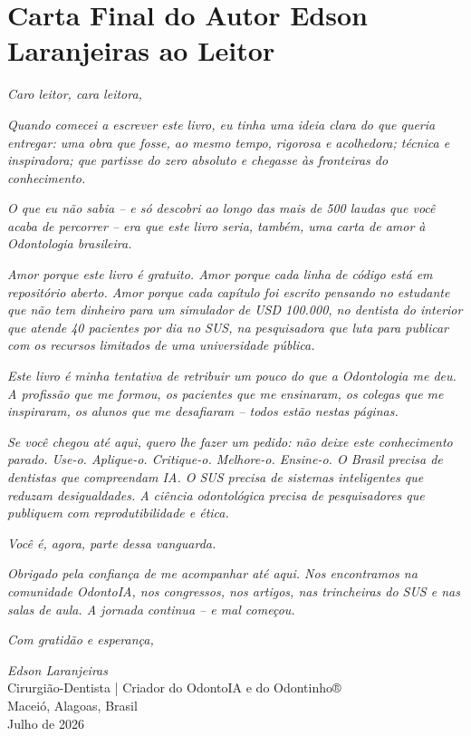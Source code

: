 \section{Carta Final do Autor Edson Laranjeiras ao Leitor}
\label{sec:carta-autor}

\nivelzero

\textit{Caro leitor, cara leitora,}

\textit{Quando comecei a escrever este livro, eu tinha uma ideia clara do que
queria entregar: uma obra que fosse, ao mesmo tempo, rigorosa e acolhedora;
técnica e inspiradora; que partisse do zero absoluto e chegasse às fronteiras
do conhecimento.}

\textit{O que eu não sabia -- e só descobri ao longo das mais de 500 laudas que
você acaba de percorrer -- era que este livro seria, também, uma carta de amor
à Odontologia brasileira.}

\textit{Amor porque este livro é gratuito. Amor porque cada linha de código está
em repositório aberto. Amor porque cada capítulo foi escrito pensando no
estudante que não tem dinheiro para um simulador de USD 100.000, no dentista
do interior que atende 40 pacientes por dia no SUS, na pesquisadora que luta
para publicar com os recursos limitados de uma universidade pública.}

\textit{Este livro é minha tentativa de retribuir um pouco do que a Odontologia
me deu. A profissão que me formou, os pacientes que me ensinaram, os colegas
que me inspiraram, os alunos que me desafiaram -- todos estão nestas páginas.}

\textit{Se você chegou até aqui, quero lhe fazer um pedido: não deixe este
conhecimento parado. Use-o. Aplique-o. Critique-o. Melhore-o. Ensine-o.
O Brasil precisa de dentistas que compreendam IA. O SUS precisa de sistemas
inteligentes que reduzam desigualdades. A ciência odontológica precisa de
pesquisadores que publiquem com reprodutibilidade e ética.}

\textit{Você é, agora, parte dessa vanguarda.}

\textit{Obrigado pela confiança de me acompanhar até aqui. Nos encontramos na
comunidade OdontoIA, nos congressos, nos artigos, nas trincheiras do SUS e nas
salas de aula. A jornada continua -- e mal começou.}

\begin{flushright}
\textit{Com gratidão e esperança,}

\textit{Edson Laranjeiras} \\
Cirurgião-Dentista | Criador do OdontoIA e do Odontinho® \\
Maceió, Alagoas, Brasil \\
Julho de 2026
\end{flushright}


